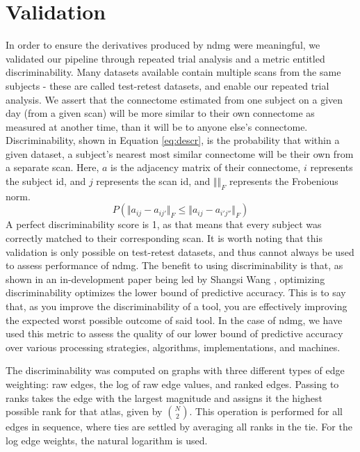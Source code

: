 \section{Validation}
\label{sec:validate}
In order to ensure the derivatives produced by ndmg were meaningful, we validated our pipeline through repeated trial analysis and a metric entitled discriminability. Many datasets available contain multiple scans from the same subjects - these are called test-retest datasets, and enable our repeated trial analysis. We assert that the connectome estimated from one subject on a given day (from a given scan) will be more similar to their own connectome as measured at another time, than it will be to anyone else's connectome. Discriminability, shown in Equation \ref{eq:descr}, is the probability that within a given dataset, a subject's nearest most similar connectome will be their own from a separate scan. Here, $a$ is the adjacency matrix of their connectome, $i$ represents the subject id, and $j$ represents the scan id, and $\Vert  \Vert_F$ represents the Frobenious norm. 
\begin{equation}
P(\Vert a_{ij} - a_{ij'}\Vert_F \leq \Vert a_{ij} - a_{i'j''}\Vert_F)
\label{eq:descr}
\end{equation}
A perfect discriminability score is 1, as that means that every subject was correctly matched to their corresponding scan. It is worth noting that this validation is only possible on test-retest datasets, and thus cannot always be used to assess performance of ndmg. The benefit to using discriminability is that, as shown in an in-development paper being led by Shangsi Wang \cite{swang2015}, optimizing discriminability optimizes the lower bound of predictive accuracy. This is to say that, as you improve the discriminability of a tool, you are effectively improving the expected worst possible outcome of said tool. In the case of ndmg, we have used this metric to assess the quality of our lower bound of predictive accuracy over various processing strategies, algorithms, implementations, and machines. 

The discriminability was computed on graphs with three different types of edge weighting: raw edges, the log of raw edge values, and ranked edges. Passing to ranks takes the edge with the largest magnitude and assigns it the highest possible rank for that atlas, given by $\binom{N}{2}$. This operation is performed for all edges in sequence, where ties are settled by averaging all ranks in the tie. For the log edge weights, the natural logarithm is used.

